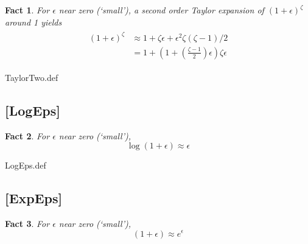 \message{ !name(MathFactsList.tex)}\documentclass{handout}
\newtheorem{Fact}{Fact}
\begin{document}
\begin{Fact} For $\epsilon$ near zero (`small'), a second order Taylor expansion
of $(1+\epsilon)^{\zeta}$ around 1 yields
\begin{equation}\begin{gathered}\begin{aligned}
 (1+\epsilon)^{\zeta} & \approx  1+ \zeta \epsilon  + \epsilon^{2} \zeta (\zeta-1)/2 
\\ & =  1 + \left(1 + \left(\frac{\zeta - 1}{2}\right)\epsilon\right)\zeta \epsilon 
\end{aligned}\end{gathered}\end{equation}
\end{Fact}

\begin{verbatimwrite}{TaylorTwo.def}
\providecommand{\TaylorTwo}{\href{https://www.econ2.jhu.edu/people/ccarroll/public/LectureNotes/MathFacts/MathFactsList\#TaylorTwo}{\ensuremath{\mathtt{[TaylorTwo]}}}}
\end{verbatimwrite}



\hypertarget{LogEps}{}
\subsection{[LogEps]}\label{fact:LogEps}

\begin{Fact} For $\epsilon$ near zero (`small'), 
\begin{equation}
\log (1+\epsilon) \approx \epsilon
\end{equation}
\end{Fact}

\begin{verbatimwrite}{LogEps.def}
\providecommand{\LogEps}{\href{https://www.econ2.jhu.edu/people/ccarroll/public/LectureNotes/MathFacts/MathFactsList\#LogEps}{\ensuremath{\mathtt{[LogEps]}}}}
\end{verbatimwrite}


\hypertarget{ExpEps}{}
\subsection{[ExpEps]}
\begin{Fact} For $\epsilon$ near zero (`small'), 
\begin{equation}
(1+\epsilon) \approx e^{\epsilon}
\end{equation}
\end{Fact}
\end{document}
